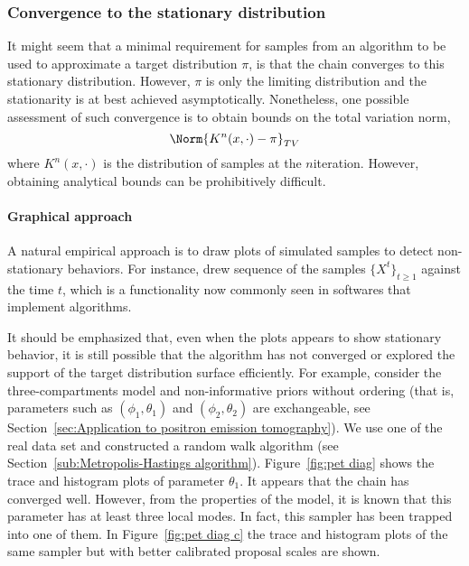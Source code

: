 \subsubsection{Convergence to the stationary distribution}
\label{ssub:Convergence to the stationary distribution}

It might seem that a minimal requirement for samples from an \mcmc algorithm
to be used to approximate a target distribution $\pi$, is that the chain
converges to this stationary distribution. However, $\pi$ is only the limiting
distribution and the stationarity is at best achieved asymptotically.
Nonetheless, one possible assessment of such convergence is to obtain bounds
on the total variation norm,
\begin{equation*}
  \Norm{K^n(x,\cdot)-\pi}_{TV}
\end{equation*}
where $K^n(x,\cdot)$ is the distribution of samples at the $n$\xth iteration.
However, obtaining analytical bounds can be prohibitively difficult.

\paragraph{Graphical approach}

A natural empirical approach is to draw plots of simulated samples to detect
non-stationary behaviors. For instance, \cite{Gelfand:1990it} drew sequence
of the samples $\{X^t\}_{t\ge1}$ against the time $t$, which is a
functionality now commonly seen in softwares that implement \mcmc
algorithms.

It should be emphasized that, even when the plots appears to show stationary
behavior, it is still possible that the algorithm has not converged or
explored the support of the target distribution surface efficiently. For
example, consider the three-compartments \pet model and non-informative
priors without ordering (that is, parameters such as $(\phi_1,\theta_1)$ and
$(\phi_2,\theta_2)$ are exchangeable, see Section~\ref{sec:Application to
positron emission tomography}). We use one of the real data set and
constructed a random walk algorithm (see Section~\ref{sub:Metropolis-Hastings
algorithm}). Figure~\ref{fig:pet diag} shows the trace and histogram plots of
parameter $\theta_1$. It appears that the \mcmc chain has converged well.
However, from the properties of the model, it is known that this parameter
has at least three local modes. In fact, this sampler has been trapped into
one of them. In Figure~\ref{fig:pet diag c} the trace and histogram plots of
the same sampler but with better calibrated proposal scales are shown.

